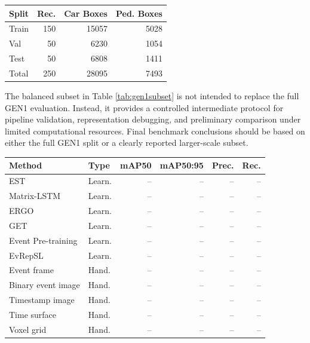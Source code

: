 \documentclass[letterpaper]{article}
\begin{document}
\begin{center}
\begin{tabular}{l|r|r|r}
Split & Rec. & Car Boxes & Ped. Boxes \\
\hline
Train & 150 & 15057 & 5028 \\
Val & 50 & 6230 & 1054 \\
Test & 50 & 6808 & 1411 \\
Total & 250 & 28095 & 7493 \\
\end{tabular}
\label{tab:gen1subset}
\end{center}

The balanced subset in Table \ref{tab:gen1subset} is not intended to replace the full GEN1 evaluation. Instead, it provides a controlled intermediate protocol for pipeline validation, representation debugging, and preliminary comparison under limited computational resources. Final benchmark conclusions should be based on either the full GEN1 split or a clearly reported larger-scale subset.

\begin{center}
\begin{footnotesize}
\setlength{\tabcolsep}{2pt}
\begin{tabular}{p{0.78in}|p{0.46in}|r|r|r|r}
Method & Type & mAP50 & mAP50:95 & Prec. & Rec. \\
\hline
EST & Learn. & -- & -- & -- & -- \\
Matrix-LSTM & Learn. & -- & -- & -- & -- \\
ERGO & Learn. & -- & -- & -- & -- \\
GET & Learn. & -- & -- & -- & -- \\
Event Pre-training & Learn. & -- & -- & -- & -- \\
EvRepSL & Learn. & -- & -- & -- & -- \\
Event frame & Hand. & -- & -- & -- & -- \\
Binary event image & Hand. & -- & -- & -- & -- \\
Timestamp image & Hand. & -- & -- & -- & -- \\
Time surface & Hand. & -- & -- & -- & -- \\
Voxel grid & Hand. & -- & -- & -- & -- \\
\end{tabular}
\end{footnotesize}
\label{tab:gen1results}
\end{center}
\end{document}
